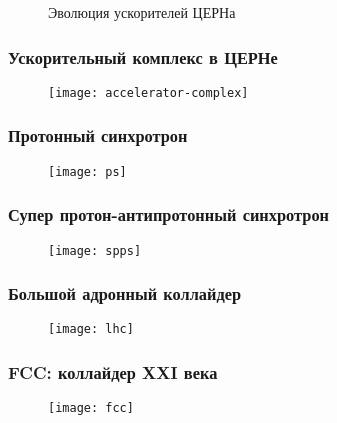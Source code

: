 \begin{frame}
    \begin{figure}
    {\LARGE Эволюция ускорителей ЦЕРНа}
    \end{figure}
\end{frame}
\begin{frame}
    \frametitle{Ускорительный комплекс в ЦЕРНе}
    \begin{figure}
        \begin{centering}
            \texttt{[image: accelerator-complex]}
        \end{centering}
    \end{figure}
\end{frame}
\begin{frame}
    \frametitle{Протонный синхротрон}
    \begin{figure}
        \begin{centering}
            \texttt{[image: ps]}
        \end{centering}
    \end{figure}
\end{frame}
\begin{frame}
    \frametitle{Супер протон-антипротонный синхротрон}
    \begin{figure}
        \begin{centering}
            \texttt{[image: spps]}
        \end{centering}
    \end{figure}
\end{frame}
\begin{frame}
    \frametitle{Большой адронный коллайдер}
    \begin{figure}
        \begin{centering}
            \texttt{[image: lhc]}
        \end{centering}
    \end{figure}
\end{frame}
\begin{frame}
    \frametitle{FCC: коллайдер XXI века}
    \begin{figure}
        \begin{centering}
            \texttt{[image: fcc]}
        \end{centering}
    \end{figure}
\end{frame}
